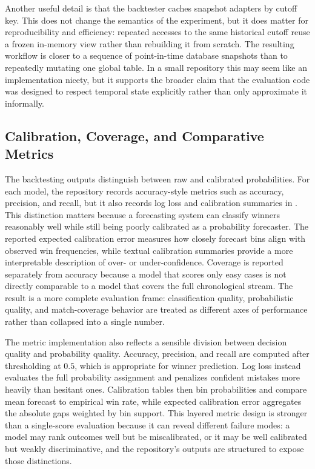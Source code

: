 \documentclass{article}
\begin{document}
Another useful detail is that the backtester caches snapshot adapters by cutoff key. This does not change the semantics of the experiment, but it does matter for reproducibility and efficiency: repeated accesses to the same historical cutoff reuse a frozen in-memory view rather than rebuilding it from scratch. The resulting workflow is closer to a sequence of point-in-time database snapshots than to repeatedly mutating one global table. In a small repository this may seem like an implementation nicety, but it supports the broader claim that the evaluation code was designed to respect temporal state explicitly rather than only approximate it informally.

\subsection*{Calibration, Coverage, and Comparative Metrics}
The backtesting outputs distinguish between raw and calibrated probabilities. For each model, the repository records accuracy-style metrics such as accuracy, precision, and recall, but it also records log loss and calibration summaries in . This distinction matters because a forecasting system can classify winners reasonably well while still being poorly calibrated as a probability forecaster. The reported expected calibration error measures how closely forecast bins align with observed win frequencies, while textual calibration summaries provide a more interpretable description of over- or under-confidence. Coverage is reported separately from accuracy because a model that scores only easy cases is not directly comparable to a model that covers the full chronological stream. The result is a more complete evaluation frame: classification quality, probabilistic quality, and match-coverage behavior are treated as different axes of performance rather than collapsed into a single number.

The metric implementation also reflects a sensible division between decision quality and probability quality. Accuracy, precision, and recall are computed after thresholding at \(0.5\), which is appropriate for winner prediction. Log loss instead evaluates the full probability assignment and penalizes confident mistakes more heavily than hesitant ones. Calibration tables then bin probabilities and compare mean forecast to empirical win rate, while expected calibration error aggregates the absolute gaps weighted by bin support. This layered metric design is stronger than a single-score evaluation because it can reveal different failure modes: a model may rank outcomes well but be miscalibrated, or it may be well calibrated but weakly discriminative, and the repository's outputs are structured to expose those distinctions.
\end{document}
